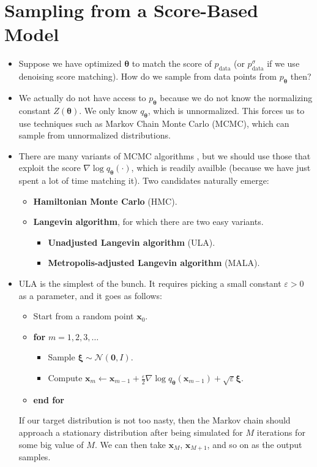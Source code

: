 \documentclass[10pt]{article}
\newcommand{\ve}[1]{\mathbf{#1}}
\newcommand{\mrm}[1]{\mathrm{#1}}
\newcommand{\ves}[1]{\boldsymbol{#1}}
\newcommand{\mcal}[1]{\mathcal{#1}}
\begin{document}
\section{Sampling from a Score-Based Model}

\begin{itemize}
  \item Suppose we have optimized $\ves{\theta}$ to match the score of $p_{\mrm{data}}$ (or $p_{\mrm{data}}^\sigma$ if we use denoising score matching). How do we sample from data points from $p_{\ves{\theta}}$ then?
  
  \item We actually do not have access to $p_{\ves{\theta}}$ because we do not know the normalizing constant $Z(\ves{\theta})$. We only know $q_{\ves{\theta}}$, which is unnormalized. This forces us to use techniques such as Markov Chain Monte Carlo (MCMC), which can sample from unnormalized distributions.
  
  \item There are many variants of MCMC algorithms \cite{KhungurnMcmc}, but we should use those that exploit the score $\nabla \log q_{\ves{\theta}}(\cdot)$, which is readily availble (because we have just spent a lot of time matching it). Two candidates naturally emerge:
  \begin{itemize}
    \item {\bf Hamiltonian Monte Carlo} (HMC).
    \item {\bf Langevin algorithm}, for which there are two easy variants.
    \begin{itemize}
      \item {\bf Unadjusted Langevin algorithm} (ULA).
      \item {\bf Metropolis-adjusted Langevin algorithm} (MALA).
    \end{itemize}
  \end{itemize}

  \item ULA is the simplest of the bunch. It requires picking a small constant $\varepsilon > 0$ as a parameter, and it goes as follows:
  \begin{itemize}
    \item Start from a random point $\ve{x}_0$.
    \item {\bf for} $m = 1, 2, 3, \dotsc$
    \begin{itemize}
      \item Sample $\ves{\xi} \sim \mcal{N}(\ve{0}, I)$.
      \item Compute $\ve{x}_{m} \gets \ve{x}_{m-1} + \frac{\varepsilon}{2} \nabla \log q_{\ves{\theta}}(\ve{x}_{m-1}) + \sqrt{\varepsilon} \ves{\xi}$.
    \end{itemize}
    \item[] {\bf end for}
  \end{itemize}
  If our target distribution is not too nasty, then the Markov chain should approach a stationary distribution after being simulated for $M$ iterations for some big value of $M$. We can then take $\ve{x}_M$, $\ve{x}_{M+1}$, and so on as the output samples.


\end{itemize}
\end{document}
